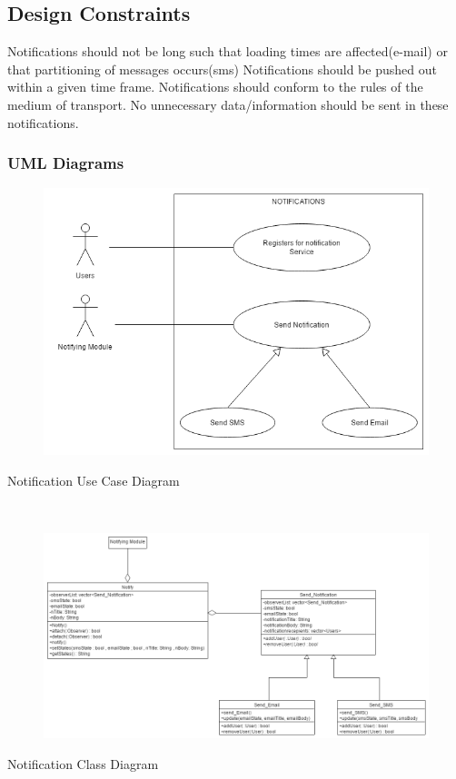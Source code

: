 \documentclass{article}
\begin{document}
    \subsection{Design Constraints}
    \begin{flushleft}
    Notifications should not be long such that loading times are affected(e-mail) or that partitioning of messages occurs(sms)
    \newline
    Notifications should be pushed out within a given time frame.
    \newline
    Notifications should conform to the rules of the medium of transport.
    \newline
    No unnecessary data/information should be sent in these notifications. 
    \end{flushleft}
    
    
    \clearpage
    \subsubsection{UML Diagrams}
    
    \begin{figure}[h!]
        \includegraphics[width=\textwidth]{Notifications_Use_Case.png}
    \end{figure}
    Notification Use Case Diagram
    
    \mbox{}\\
    \bigskip
    \clearpage
    
    \begin{figure}[h!]
      \includegraphics[width=\textwidth]{Notifications_Class_Diagram.png}
    \end{figure}
    Notification Class Diagram
    
\end{document}
